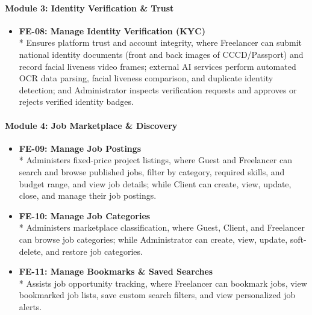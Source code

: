 \paragraph*{Module 3: Identity Verification \& Trust}
\begin{itemize}[leftmargin=1.0cm, label=--]

\item \textbf{FE-08: Manage Identity Verification (KYC)} \\*
Ensures platform trust and account integrity, where Freelancer can submit national identity documents (front and back images of CCCD/Passport) and record facial liveness video frames; external AI services perform automated OCR data parsing, facial liveness comparison, and duplicate identity detection; and Administrator inspects verification requests and approves or rejects verified identity badges.

\end{itemize}

\paragraph*{Module 4: Job Marketplace \& Discovery}
\begin{itemize}[leftmargin=1.0cm, label=--]

\item \textbf{FE-09: Manage Job Postings} \\*
Administers fixed-price project listings, where Guest and Freelancer can search and browse published jobs, filter by category, required skills, and budget range, and view job details; while Client can create, view, update, close, and manage their job postings.

\item \textbf{FE-10: Manage Job Categories} \\*
Administers marketplace classification, where Guest, Client, and Freelancer can browse job categories; while Administrator can create, view, update, soft-delete, and restore job categories.

\item \textbf{FE-11: Manage Bookmarks \& Saved Searches} \\*
Assists job opportunity tracking, where Freelancer can bookmark jobs, view bookmarked job lists, save custom search filters, and view personalized job alerts.

\end{itemize}

